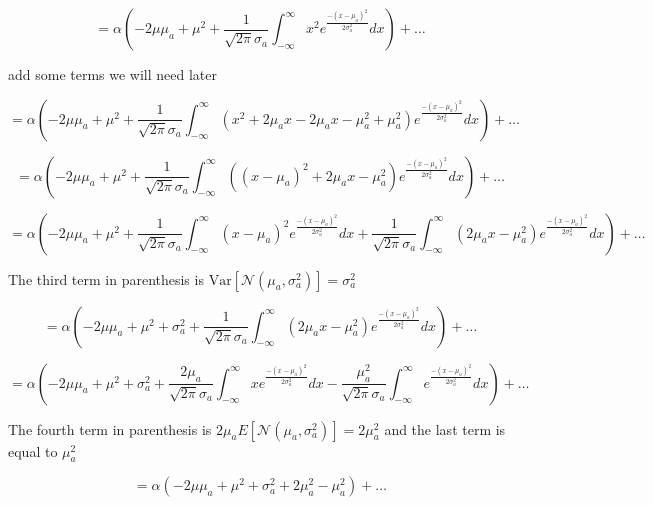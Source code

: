 \documentclass{article}
\newcommand{\Var}{\mathrm{Var}}
\begin{document}
\begin{equation}
     = \alpha \left( -2 \mu \mu_a + \mu^2 + \frac{1}{\sqrt{2\pi}\sigma_a} \int_{-\infty}^{\infty} x^2 e^{\frac{-(x-\mu_a)^2}{2\sigma_a^2}} dx \right) + \ldots
\end{equation}

add some terms we will need later

\begin{equation}
     = \alpha \left( -2 \mu \mu_a + \mu^2 + \frac{1}{\sqrt{2\pi}\sigma_a} \int_{-\infty}^{\infty} (x^2 + 2\mu_a x - 2 \mu_a x - \mu_a^2 + \mu_a^2) e^{\frac{-(x-\mu_a)^2}{2\sigma_a^2}} dx \right) + \ldots
\end{equation}

\begin{equation}
     = \alpha \left( -2 \mu \mu_a + \mu^2 + \frac{1}{\sqrt{2\pi}\sigma_a} \int_{-\infty}^{\infty} ( (x-\mu_a)^2 + 2\mu_a x - \mu_a^2) e^{\frac{-(x-\mu_a)^2}{2\sigma_a^2}} dx \right) + \ldots
\end{equation}

\begin{equation}
     = \alpha \left( -2 \mu \mu_a + \mu^2 + \frac{1}{\sqrt{2\pi}\sigma_a} \int_{-\infty}^{\infty} (x-\mu_a)^2 e^{\frac{-(x-\mu_a)^2}{2\sigma_a^2}} dx + \frac{1}{\sqrt{2\pi}\sigma_a} \int_{-\infty}^{\infty} (2\mu_a x - \mu_a^2 ) e^{\frac{-(x-\mu_a)^2}{2\sigma_a^2}} dx \right) + \ldots
\end{equation}

The third term in parenthesis is $\Var[\mathcal{N}(\mu_a, \sigma_a^2)]=\sigma_a^2$ 

\begin{equation}
     = \alpha \left( -2 \mu \mu_a + \mu^2 + \sigma_a^2 + \frac{1}{\sqrt{2\pi}\sigma_a} \int_{-\infty}^{\infty} (2\mu_a x - \mu_a^2 ) e^{\frac{-(x-\mu_a)^2}{2\sigma_a^2}} dx \right) + \ldots
\end{equation}

\begin{equation}
     = \alpha \left( -2 \mu \mu_a + \mu^2 + \sigma_a^2 + \frac{2\mu_a}{\sqrt{2\pi}\sigma_a} \int_{-\infty}^{\infty} x e^{\frac{-(x-\mu_a)^2}{2\sigma_a^2}} dx - \frac{\mu_a^2}{\sqrt{2\pi}\sigma_a} \int_{-\infty}^{\infty} e^{\frac{-(x-\mu_a)^2}{2\sigma_a^2}} dx \right) + \ldots
\end{equation}

The fourth term in parenthesis is $2\mu_a E[\mathcal{N}(\mu_a, \sigma_a^2)]=2 \mu_a^2$ and the last term is equal to $\mu_a^2$

\begin{equation}
     = \alpha \left( -2 \mu \mu_a + \mu^2 + \sigma_a^2 + 2 \mu_a^2 - \mu_a^2 \right) + \ldots
\end{equation}
\end{document}
